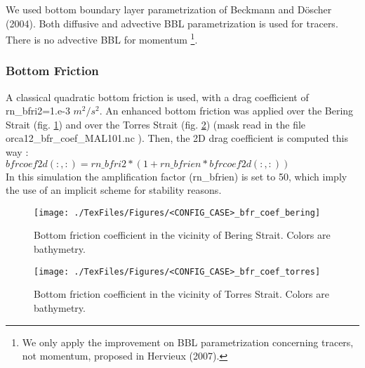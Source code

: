 We used bottom boundary layer parametrization of Beckmann and D\"oscher (2004)\cite{Beckmann1997}. 
Both diffusive and advective BBL parametrization is used for tracers. 
There is no advective BBL for momentum \footnote{We only apply the 
improvement on BBL parametrization concerning tracers, not momentum, proposed in Hervieux (2007)\cite{Hervieux}.}.\\



\subsubsection{Bottom Friction}

A classical quadratic bottom friction is used, with a drag coefficient of rn\_bfri2=1.e-3 $m^2/s^2$. 
An enhanced bottom friction was applied over the Bering Strait (fig. \ref{bfrcoef2}) and over the Torres Strait (fig. \ref{bfrcoef1}) (mask read in 
the file orca12\_bfr\_coef\_MAL101.nc ). Then, the 2D drag coefficient is computed this way :\\
$ bfrcoef2d(:,:) = rn\_bfri2 * ( 1 + rn\_bfrien * bfrcoef2d(:,:) ) $ \\
In this simulation the amplification factor (rn\_bfrien) is set to 50, which imply the use of an implicit scheme for stability reasons. 


\begin{figure}[H]
\begin{center}
\texttt{[image: ./TexFiles/Figures/<CONFIG\_CASE>\_bfr\_coef\_bering]}
\caption{Bottom friction coefficient in the vicinity of Bering Strait. Colors are bathymetry.}
\label{bfrcoef2}
\end{center}
\end{figure}
%
\begin{figure}[H]
\begin{center}
\texttt{[image: ./TexFiles/Figures/<CONFIG\_CASE>\_bfr\_coef\_torres]}
\caption{Bottom friction coefficient in the vicinity of Torres Strait. Colors are bathymetry.}
\label{bfrcoef1}
\end{center}
\end{figure}

